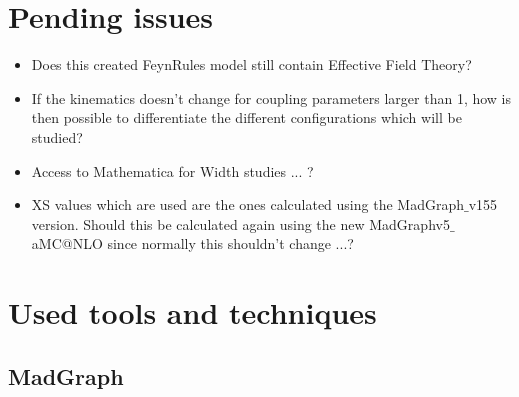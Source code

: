 \documentclass[a4paper,12pt]{report}
\date{Started 4 April 2014}
\begin{document}
\setcounter{secnumdepth}{3} %
\setcounter{tocdepth}{2}    %

\maketitle
\tableofcontents
\newpage

\chapter{Pending issues}
\begin{itemize}
  \item Does this created FeynRules model still contain Effective Field Theory?
  \item If the kinematics doesn't change for coupling parameters larger than 1, how is then possible to differentiate the different configurations which will be studied?
  \item Access to Mathematica for Width studies ... ?
  \item XS values which are used are the ones calculated using the MadGraph$\_$v155 version. Should this be calculated again using the new MadGraphv5$\_$aMC@NLO since normally this shouldn't change ...?
\end{itemize}

\chapter{Used tools and techniques}

\section{MadGraph}
\end{document}
